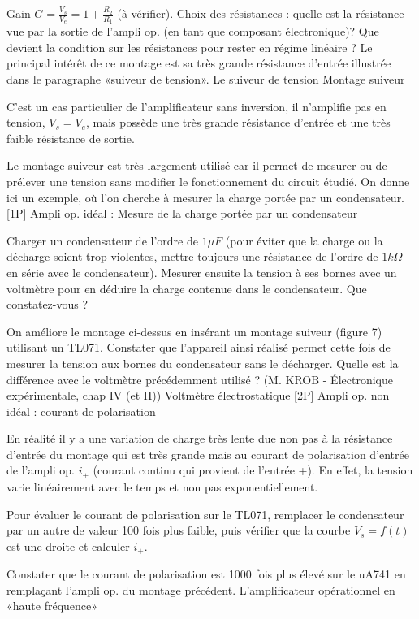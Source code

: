 \documentclass{article}%
\begin{document}
Gain $G = \frac{V_s}{V_e} = 1 + \frac{R_2}{R_1}$ (à vérifier). Choix des résistances : quelle est la résistance vue par la sortie de l'ampli op. (en tant que composant électronique)? Que devient la condition sur les résistances pour rester en régime linéaire ? Le principal intérêt de ce montage est sa très grande résistance d'entrée illustrée dans le paragraphe «suiveur de tension».
Le suiveur de tension
Montage suiveur

C'est un cas particulier de l'amplificateur sans inversion, il n'amplifie pas en tension, $V_{s} = V_{e}$, mais possède une très grande résistance d'entrée et une très faible résistance de sortie.

Le montage suiveur est très largement utilisé car il permet de mesurer ou de prélever une tension sans modifier le fonctionnement du circuit étudié. On donne ici un exemple, où l'on cherche à mesurer la charge portée par un condensateur.
[1P] Ampli op. idéal : Mesure de la charge portée par un condensateur

Charger un condensateur de l'ordre de $1 \textstyle \mu F$ (pour éviter que la charge ou la décharge soient trop violentes, mettre toujours une résistance de l'ordre de $1 k \Omega$ en série avec le condensateur). Mesurer ensuite la tension à ses bornes avec un voltmètre pour en déduire la charge contenue dans le condensateur. Que constatez-vous ?

On améliore le montage ci-dessus en insérant un montage suiveur (figure 7) utilisant un TL071. Constater que l'appareil ainsi réalisé permet cette fois de mesurer la tension aux bornes du condensateur sans le décharger. Quelle est la différence avec le voltmètre précédemment utilisé ? (M. KROB - Électronique expérimentale, chap IV (et II))
Voltmètre électrostatique
[2P] Ampli op. non idéal : courant de polarisation

En réalité il y a une variation de charge très lente due non pas à la résistance d'entrée du montage qui est très grande mais au courant de polarisation d'entrée de l'ampli op. $i_{+}$ (courant continu qui provient de l'entrée +). En effet, la tension varie linéairement avec le temps et non pas exponentiellement.


Pour évaluer le courant de polarisation sur le TL071, remplacer le condensateur par un autre de valeur 100 fois plus faible, puis vérifier que la courbe $ V_{s} = f(t)$ est une droite et calculer $i_{+}$.

Constater que le courant de polarisation est 1000 fois plus élevé sur le uA741 en remplaçant l'ampli op. du montage précédent.
L'amplificateur opérationnel en «haute fréquence»
\end{document}
